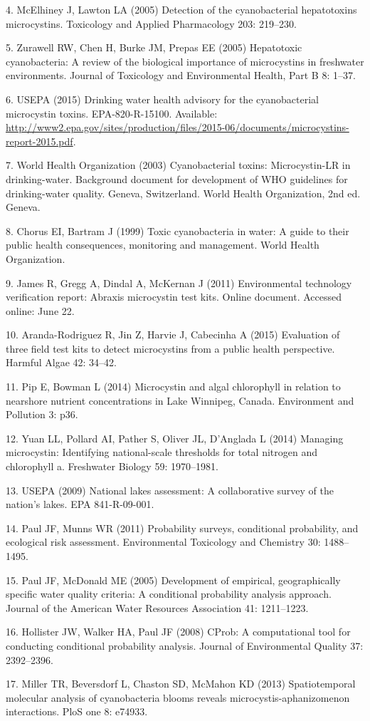 \documentclass[10pt,a4paper,twocolumn]{article}
\begin{document}
4. McElhiney J, Lawton LA (2005) Detection of the cyanobacterial
hepatotoxins microcystins. Toxicology and Applied Pharmacology 203:
219--230.

5. Zurawell RW, Chen H, Burke JM, Prepas EE (2005) Hepatotoxic
cyanobacteria: A review of the biological importance of microcystins in
freshwater environments. Journal of Toxicology and Environmental Health,
Part B 8: 1--37.

6. USEPA (2015) Drinking water health advisory for the cyanobacterial
microcystin toxins. EPA-820-R-15100. Available:
\url{http://www2.epa.gov/sites/production/files/2015-06/documents/microcystins-report-2015.pdf}.

7. World Health Organization (2003) Cyanobacterial toxins:
Microcystin-LR in drinking-water. Background document for development of
WHO guidelines for drinking-water quality. Geneva, Switzerland. World
Health Organization, 2nd ed. Geneva.

8. Chorus EI, Bartram J (1999) Toxic cyanobacteria in water: A guide to
their public health consequences, monitoring and management. World
Health Organization.

9. James R, Gregg A, Dindal A, McKernan J (2011) Environmental
technology verification report: Abraxis microcystin test kits. Online
document. Accessed online: June 22.

10. Aranda-Rodriguez R, Jin Z, Harvie J, Cabecinha A (2015) Evaluation
of three field test kits to detect microcystins from a public health
perspective. Harmful Algae 42: 34--42.

11. Pip E, Bowman L (2014) Microcystin and algal chlorophyll in relation
to nearshore nutrient concentrations in Lake Winnipeg, Canada.
Environment and Pollution 3: p36.

12. Yuan LL, Pollard AI, Pather S, Oliver JL, D'Anglada L (2014)
Managing microcystin: Identifying national-scale thresholds for total
nitrogen and chlorophyll a. Freshwater Biology 59: 1970--1981.

13. USEPA (2009) National lakes assessment: A collaborative survey of
the nation's lakes. EPA 841-R-09-001.

14. Paul JF, Munns WR (2011) Probability surveys, conditional
probability, and ecological risk assessment. Environmental Toxicology
and Chemistry 30: 1488--1495.

15. Paul JF, McDonald ME (2005) Development of empirical, geographically
specific water quality criteria: A conditional probability analysis
approach. Journal of the American Water Resources Association 41:
1211--1223.

16. Hollister JW, Walker HA, Paul JF (2008) CProb: A computational tool
for conducting conditional probability analysis. Journal of
Environmental Quality 37: 2392--2396.

17. Miller TR, Beversdorf L, Chaston SD, McMahon KD (2013)
Spatiotemporal molecular analysis of cyanobacteria blooms reveals
microcystis-aphanizomenon interactions. PloS one 8: e74933.
\end{document}

